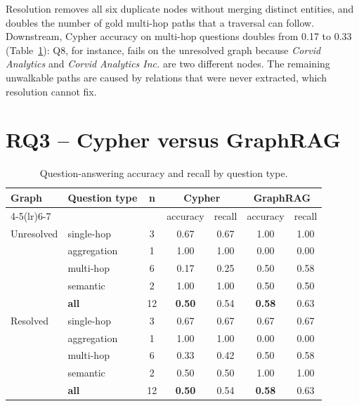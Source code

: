 \documentclass[11pt,a4paper]{report}
\newcommand{\RQ}[1]{\textbf{RQ#1}}
\begin{document}
Resolution removes all six duplicate nodes without merging distinct entities, and doubles the number of gold
multi-hop paths that a traversal can follow. Downstream, Cypher accuracy on multi-hop questions doubles from 0.17
to 0.33 (Table~\ref{tab:rq3}): Q8, for instance, fails on the unresolved graph because \emph{Corvid Analytics} and
\emph{Corvid Analytics Inc.} are two different nodes. The remaining unwalkable paths are caused by relations that
were never extracted, which resolution cannot fix.

\section{\RQ{3} -- Cypher versus GraphRAG}
\begin{table}[ht]
\centering
\small
\begin{tabular}{llccccc}
\toprule
\textbf{Graph} & \textbf{Question type} & \textbf{n} & \multicolumn{2}{c}{\textbf{Cypher}} & \multicolumn{2}{c}{\textbf{GraphRAG}} \\
\cmidrule(lr){4-5}\cmidrule(lr){6-7}
 & & & accuracy & recall & accuracy & recall \\
\midrule
Unresolved & single-hop & 3 & 0.67 & 0.67 & 1.00 & 1.00 \\
 & aggregation & 1 & 1.00 & 1.00 & 0.00 & 0.00 \\
 & multi-hop & 6 & 0.17 & 0.25 & 0.50 & 0.58 \\
 & semantic & 2 & 1.00 & 1.00 & 0.50 & 0.50 \\
 & \textbf{all} & 12 & \textbf{0.50} & 0.54 & \textbf{0.58} & 0.63 \\
\midrule
Resolved & single-hop & 3 & 0.67 & 0.67 & 0.67 & 0.67 \\
 & aggregation & 1 & 1.00 & 1.00 & 0.00 & 0.00 \\
 & multi-hop & 6 & 0.33 & 0.42 & 0.50 & 0.58 \\
 & semantic & 2 & 0.50 & 0.50 & 1.00 & 1.00 \\
 & \textbf{all} & 12 & \textbf{0.50} & 0.54 & \textbf{0.58} & 0.63 \\
\bottomrule
\end{tabular}
\caption{Question-answering accuracy and recall by question type.}
\label{tab:rq3}
\end{table}
\end{document}
